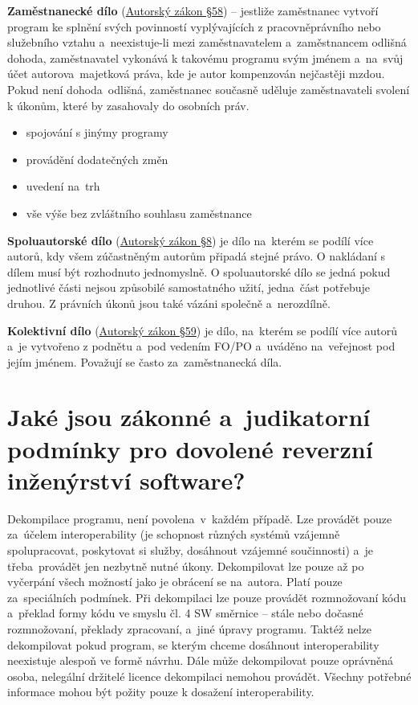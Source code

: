 \textbf{Zaměstnanecké dílo} (\href{https://www.zakonyprolidi.cz/cs/2000-121#p58}{Autorský zákon §58}) -- jestliže zaměstnanec vytvoří program ke splnění svých povinností vyplývajících z pracovněprávního nebo služebního vztahu a~neexistuje-li mezi zaměstnavatelem a~zaměstnancem odlišná dohoda, zaměstnavatel vykonává k takovému programu svým jménem a~na~svůj účet autorova~majetková práva, kde je autor kompenzován nejčastěji mzdou. Pokud není dohoda~odlišná, zaměstnanec současně uděluje zaměstnavateli svolení k úkonům, které by zasahovaly do osobních práv.
\begin{itemize}[noitemsep]
    \item spojování s jinýmy programy
    \item provádění dodatečných změn
    \item uvedení na~trh
    \item vše výše bez zvláštního souhlasu zaměstnance
\end{itemize}

\textbf{Spoluautorské dílo} (\href{https://www.zakonyprolidi.cz/cs/2000-121#p8}{Autorský zákon §8}) je dílo na~kterém se podílí více autorů, kdy všem zúčastněným autorům připadá stejné právo. O nakládaní s dílem musí být rozhodnuto jednomyslně. O spoluautorské dílo se jedná pokud jednotlivé části nejsou způsobilé samostatného užití, jedna~část potřebuje druhou. Z právních úkonů jsou také vázáni společně a~nerozdílně.

\textbf{Kolektivní dílo} (\href{https://www.zakonyprolidi.cz/cs/2000-121#p59}{Autorský zákon §59}) je dílo, na~kterém se podílí více autorů a~je vytvořeno z podnětu a~pod vedením FO/PO a~uváděno na~veřejnost pod jejím jménem. Považují se často za~zaměstnanecká díla.


\section{Jaké jsou zákonné a~judikatorní podmínky pro dovolené reverzní inženýrství software?}

Dekompilace programu, není povolena~v~každém případě. Lze provádět pouze za~účelem interoperability (je schopnost různých systémů vzájemně spolupracovat, poskytovat si služby, dosáhnout vzájemné součinnosti) a~je třeba~provádět jen nezbytně nutné úkony. Dekompilovat lze pouze až po vyčerpání všech možností jako je obrácení se na~autora. Platí pouze za~speciálních podmínek. Při dekompilaci lze pouze provádět rozmnožovaní kódu a~překlad formy kódu ve smyslu čl. 4 SW směrnice -- stále nebo dočasné rozmnožovaní, překlady zpracovaní, a~jiné úpravy programu. Taktéž nelze dekompilovat pokud program, se kterým chceme dosáhnout interoperability neexistuje alespoň ve formě návrhu. Dále může dekompilovat pouze oprávněná osoba, nelegální držitelé licence dekompilaci nemohou provádět. Všechny potřebné informace mohou být požity pouze k dosažení interoperability. 

